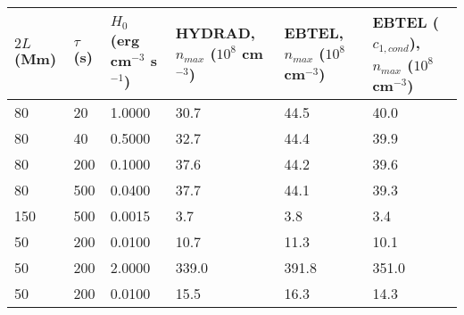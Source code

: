 \begin{tabular}{llllll}
\toprule
$2L$ (Mm) & $\tau$ (s) & $H_0$ (erg cm$^{-3}$ s$^{-1}$) & HYDRAD, $n_{max}$ ($10^8$ cm$^{-3}$) & EBTEL, $n_{max}$ ($10^8$ cm$^{-3}$) & EBTEL ($c_{1,cond}$), $n_{max}$ ($10^8$ cm$^{-3}$) \\
\midrule
       80 &         20 &                         1.0000 &                                 30.7 &                                44.5 &                                               40.0 \\
       80 &         40 &                         0.5000 &                                 32.7 &                                44.4 &                                               39.9 \\
       80 &        200 &                         0.1000 &                                 37.6 &                                44.2 &                                               39.6 \\
       80 &        500 &                         0.0400 &                                 37.7 &                                44.1 &                                               39.3 \\
      150 &        500 &                         0.0015 &                                  3.7 &                                 3.8 &                                                3.4 \\
       50 &        200 &                         0.0100 &                                 10.7 &                                11.3 &                                               10.1 \\
       50 &        200 &                         2.0000 &                                339.0 &                               391.8 &                                              351.0 \\
       50 &        200 &                         0.0100 &                                 15.5 &                                16.3 &                                               14.3 \\
\bottomrule
\end{tabular}
